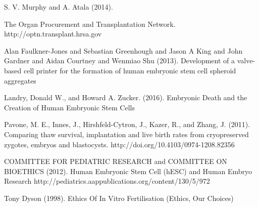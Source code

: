 \documentclass[12pt]{article} %
\begin{document}
\begin{thebibliography}{99} %

\newblock S. V. Murphy and A. Atala (2014).

\newblock The Organ Procurement and Transplantation Network.
\newblock http://optn.transplant.hrsa.gov

\newblock Alan Faulkner-Jones and Sebastian Greenhough and Jason A King and John Gardner and Aidan Courtney and Wenmiao Shu (2013).
\newblock Development of a valve-based cell printer for the formation of human embryonic stem cell spheroid aggregates

\newblock Landry, Donald W., and Howard A. Zucker. (2016).
\newblock Embryonic Death and the Creation of Human Embryonic Stem Cells

\newblock Pavone, M. E., Innes, J., Hirshfeld-Cytron, J., Kazer, R., and Zhang, J. (2011).
\newblock Comparing thaw survival, implantation and live birth rates from cryopreserved zygotes, embryos and blastocysts. 
\newblock http://doi.org/10.4103/0974-1208.82356

\newblock COMMITTEE FOR PEDIATRIC RESEARCH and COMMITTEE ON BIOETHICS (2012).
\newblock Human Embryonic Stem Cell (hESC) and Human Embryo Research
\newblock http://pediatrics.aappublications.org/content/130/5/972


\newblock Tony Dyson (1998).
\newblock Ethics Of In Vitro Fertilisation (Ethics, Our Choices)


\end{thebibliography}

\end{document}
